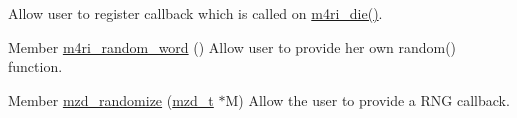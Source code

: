 \begin{DoxyRefList}
%
Allow user to register callback which is called on \mbox{\hyperlink{misc_8h_a99247474582ef8ad10ddabd2be39af61}{m4ri\+\_\+die()}}. 
\item[Member \mbox{\hyperlink{misc_8h_acfff993c60874755b199fec125de613a}{m4ri\+\_\+random\+\_\+word}} ()]\label{todo__todo000006}%
%
Allow user to provide her own random() function.  
\item[Member \mbox{\hyperlink{mzd_8h_a3167fa0d3b20f8a707e1aa98562be7fa}{mzd\+\_\+randomize}} (\mbox{\hyperlink{structmzd__t}{mzd\+\_\+t}} $\ast$M)]\label{todo__todo000011}%
%
Allow the user to provide a R\+NG callback. 
\end{DoxyRefList}